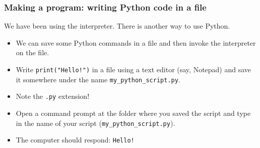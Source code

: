 \documentclass[notes]{beamer}
\begin{document}
\begin{frame}[fragile]
    \frametitle{Making a program: writing Python code in a file}
    We have been using the interpreter. There is another way to use Python.
    \begin{itemize}
        \item We can save some Python commands in a file and then invoke the interpreter on the file.
        \pause
        \item Write \lstinline|print("Hello!")| in a file using a text editor (say, Notepad) and save it somewhere under the name \lstinline|my_python_script.py|.
        \item Note the \lstinline|.py| extension!
        \pause
        \item Open a command prompt at the folder where you saved the script and type in the name of your script (\lstinline|my_python_script.py|).
        \item The computer should respond: \lstinline|Hello!|
    \end{itemize}
    
\end{frame}
\end{document}
